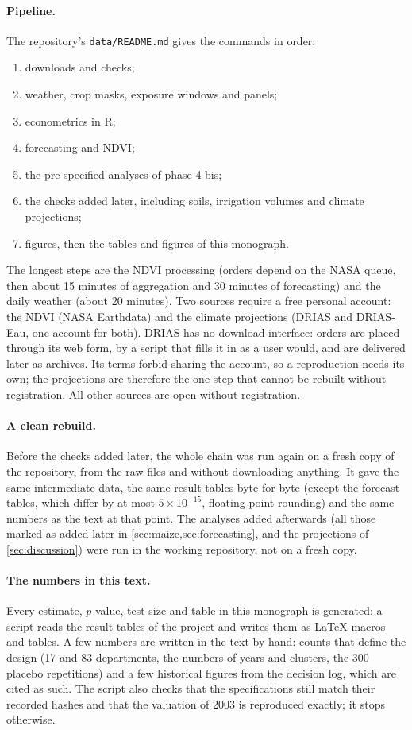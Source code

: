 \paragraph{Pipeline.} The repository's \texttt{data/README.md} gives the commands in order:
\begin{enumerate}
  \item downloads and checks;
  \item weather, crop masks, exposure windows and panels;
  \item econometrics in R;
  \item forecasting and NDVI;
  \item the pre-specified analyses of phase 4 bis;
  \item the checks added later, including soils, irrigation volumes and climate projections;
  \item figures, then the tables and figures of this monograph.
\end{enumerate}
The longest steps are the NDVI processing (orders depend on the NASA queue, then about 15 minutes of aggregation and 30 minutes of forecasting) and the daily weather (about 20 minutes). Two sources require a free personal account: the NDVI (NASA Earthdata) and the climate projections (DRIAS and DRIAS-Eau, one account for both). DRIAS has no download interface: orders are placed through its web form, by a script that fills it in as a user would, and are delivered later as archives. Its terms forbid sharing the account, so a reproduction needs its own; the projections are therefore the one step that cannot be rebuilt without registration. All other sources are open without registration.

\paragraph{A clean rebuild.} Before the checks added later, the whole chain was run again on a fresh copy of the repository, from the raw files and without downloading anything. It gave the same intermediate data, the same result tables byte for byte (except the forecast tables, which differ by at most $5\times 10^{-15}$, floating-point rounding) and the same numbers as the text at that point. The analyses added afterwards (all those marked as added later in \cref{sec:maize,sec:forecasting}, and the projections of \cref{sec:discussion}) were run in the working repository, not on a fresh copy.

\paragraph{The numbers in this text.} Every estimate, $p$-value, test size and table in this monograph is generated: a script reads the result tables of the project and writes them as \LaTeX{} macros and tables. A few numbers are written in the text by hand: counts that define the design (17 and 83 departments, the numbers of years and clusters, the 300 placebo repetitions) and a few historical figures from the decision log, which are cited as such. The script also checks that the specifications still match their recorded hashes and that the valuation of 2003 is reproduced exactly; it stops otherwise.

